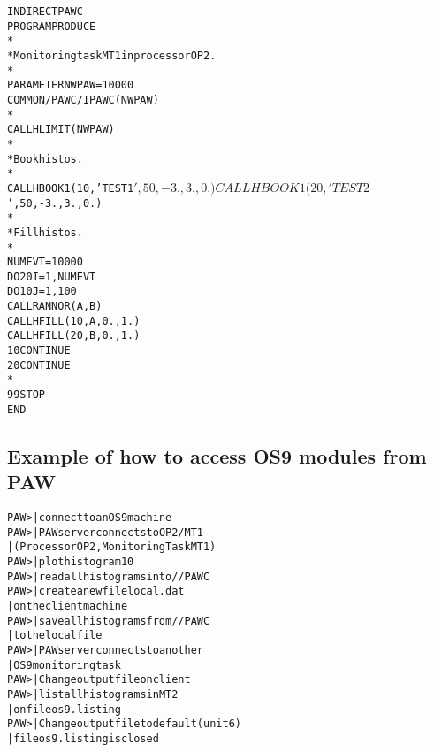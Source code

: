 \begin{minipage}{.48\textwidth}
\begin{alltt}
      INDIRECT PAWC
      PROGRAM PRODUCE
*
*        Monitoring task MT1 in processor OP2.
*
      PARAMETER NWPAW=10000
      COMMON/PAWC/IPAWC(NWPAW)
*
      CALL HLIMIT(NWPAW)
*
*       Book histos.
*
      CALL HBOOK1(10,'TEST1$',50,-3.,3.,0.)
      CALL HBOOK1(20,'TEST2$',50,-3.,3.,0.)
*
*       Fill histos.
*
      NUMEVT=10000
      DO 20 I=1,NUMEVT
         DO 10 J=1,100
            CALL RANNOR(A,B)
            CALL HFILL(10,A,0.,1.)
            CALL HFILL(20,B,0.,1.)
 10      CONTINUE
 20   CONTINUE
*
 99   STOP
      END
\end{alltt}
\end{minipage}\hfill
\begin{minipage}{.50\textwidth}
\end{minipage}
\bigskip
 
\subsection*{Example of how to access OS9 modules from PAW}
\begin{alltt}
PAW >                             | connect to an OS9 machine
PAW >                       | PAW server connects to OP2/MT1
                                                 | (Processor OP2, Monitoring Task MT1)
PAW >                               | plot histogram 10
PAW >                                      | read all histograms into //PAWC
PAW >               | create a new file local.dat
                                                 | on the client machine
PAW >                                     | save all histograms from //PAWC
                                                 | to the local file
PAW >                       | PAW server connects to another
                                                 | OS9 monitoring task
PAW >                       | Change output file on client
PAW >                                 | list all histograms in MT2
                                                 | on file os9.listing
PAW >                                 | Change output file to default (unit 6)
                                                 | file os9.listing is closed
\end{alltt}
\endinput
